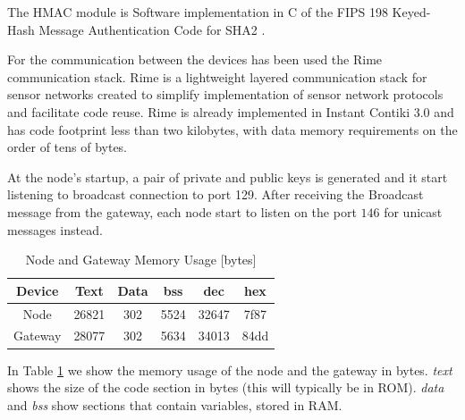 The HMAC module is Software implementation in C of the FIPS 198 Keyed-Hash Message Authentication Code for SHA2 .

For the communication between the devices has been used the Rime communication stack. %
Rime is a lightweight layered communication  stack for sensor networks created to simplify implementation of sensor network  protocols and facilitate code reuse.
Rime is already implemented in Instant Contiki 3.0 and has code footprint less than two kilobytes, with data memory requirements on the order of tens of bytes.


At the node's startup, a pair of private and public keys is generated and it start listening to broadcast connection to port 129. After receiving the Broadcast message from the gateway, each node start to listen on the port $146$ for unicast messages instead.


\begin{table}[H]
\caption{Node and Gateway Memory Usage [bytes] }
\label{nodeUsage}
\begin{center}
\begin{tabular}{|c|c|c|c|c|c|}
\hline
\textbf{Device} & \textbf{Text} &\textbf{Data} & \textbf{bss} & \textbf{dec} & \textbf{hex}  \\
\hline
Node & 26821 & 302 & 5524 & 32647 & 7f87\\
\hline
Gateway & 28077 & 302 & 5634 & 34013 & 84dd\\
\hline
\end{tabular}
\end{center}
\end{table}

In Table \ref{nodeUsage} we show the memory usage of the node and the gateway in bytes. 
\textit{text} shows the size of the code section in bytes (this will typically be in ROM).
\textit{data} and \textit{bss} show sections that contain variables, stored in RAM. 


